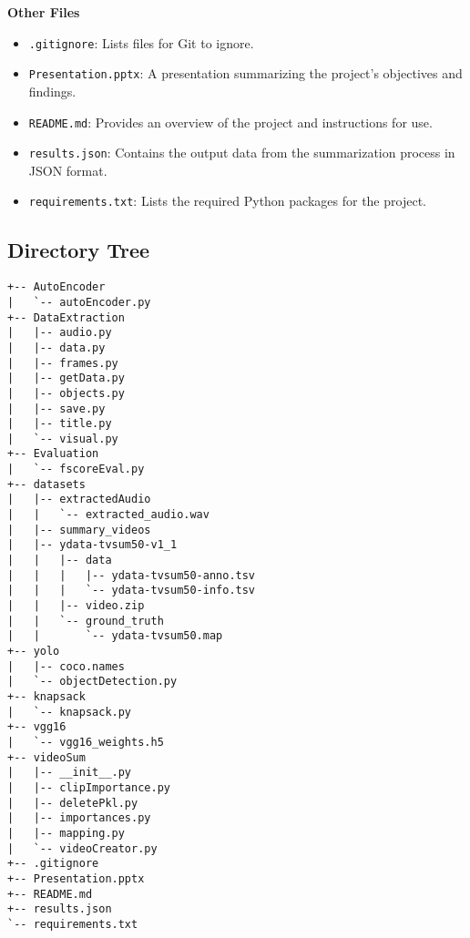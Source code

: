 \documentclass[conference]{IEEEtran}
\begin{document}
\textbf{Other Files}
\begin{itemize}
    \item \texttt{.gitignore}: Lists files for Git to ignore.
    \item \texttt{Presentation.pptx}: A presentation summarizing the project's objectives and findings.
    \item \texttt{README.md}: Provides an overview of the project and instructions for use.
    \item \texttt{results.json}: Contains the output data from the summarization process in JSON format.
    \item \texttt{requirements.txt}: Lists the required Python packages for the project.
\end{itemize}

\subsection{Directory Tree}
\begin{verbatim}
+-- AutoEncoder
|   `-- autoEncoder.py
+-- DataExtraction
|   |-- audio.py
|   |-- data.py
|   |-- frames.py
|   |-- getData.py
|   |-- objects.py
|   |-- save.py
|   |-- title.py
|   `-- visual.py
+-- Evaluation
|   `-- fscoreEval.py
+-- datasets
|   |-- extractedAudio
|   |   `-- extracted_audio.wav
|   |-- summary_videos
|   |-- ydata-tvsum50-v1_1
|   |   |-- data
|   |   |   |-- ydata-tvsum50-anno.tsv
|   |   |   `-- ydata-tvsum50-info.tsv
|   |   |-- video.zip
|   |   `-- ground_truth
|   |       `-- ydata-tvsum50.map
+-- yolo
|   |-- coco.names
|   `-- objectDetection.py
+-- knapsack
|   `-- knapsack.py
+-- vgg16
|   `-- vgg16_weights.h5
+-- videoSum
|   |-- __init__.py
|   |-- clipImportance.py
|   |-- deletePkl.py
|   |-- importances.py
|   |-- mapping.py
|   `-- videoCreator.py
+-- .gitignore
+-- Presentation.pptx
+-- README.md
+-- results.json
`-- requirements.txt
\end{verbatim}
    
\end{document}
